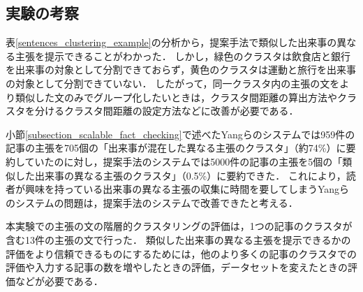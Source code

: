 \documentclass[12pt,a4j]{jreport}
\begin{document}

\subsection{実験の考察}
表\ref{sentences_clustering_example}の分析から，提案手法で類似した出来事の異なる主張を提示できることがわかった．
しかし，緑色のクラスタは飲食店と銀行を出来事の対象として分割できておらず，黄色のクラスタは運動と旅行を出来事の対象として分割できていない．
したがって，同一クラスタ内の主張の文をより類似した文のみでグループ化したいときは，クラスタ間距離の算出方法やクラスタを分けるクラスタ間距離の設定方法などに改善が必要である．

小節\ref{subsection_scalable_fact_checking}で述べたYangらのシステムでは959件の記事の主張を705個の「出来事が混在した異なる主張のクラスタ」（約74\%）に要約していたのに対し，提案手法のシステムでは5000件の記事の主張を5個の「類似した出来事の異なる主張のクラスタ」（0.5\%）に要約できた．
これにより，読者が興味を持っている出来事の異なる主張の収集に時間を要してしまうYangらのシステムの問題は，提案手法のシステムで改善できたと考える．

本実験での主張の文の階層的クラスタリングの評価は，1つの記事のクラスタが含む13件の主張の文で行った．
類似した出来事の異なる主張を提示できるかの評価をより信頼できるものにするためには，他のより多くの記事のクラスタでの評価や入力する記事の数を増やしたときの評価，データセットを変えたときの評価などが必要である．







\end{document}
